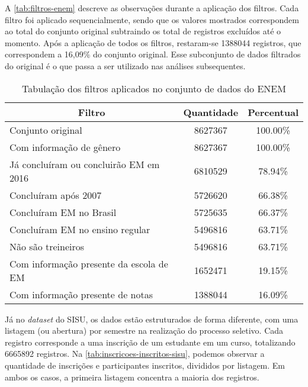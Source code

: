 A \autoref{tab:filtros-enem} descreve as observações durante a aplicação dos filtros. Cada filtro foi aplicado sequencialmente, sendo que os valores mostrados correspondem ao total do conjunto original subtraindo os total de registros excluídos até o momento. Após a aplicação de todos os filtros, restaram-se 1388044 registros, que correspondem a 16,09\% do conjunto original. Esse subconjunto de dados filtrados do original é o que passa a ser utilizado nas análises subsequentes.

\begin{table}[h]
  \begin{tabular}{lcc}
  \hline
  \multicolumn{1}{c}{\textbf{Filtro}}     & \textbf{Quantidade} & \textbf{Percentual} \\ \hline
  Conjunto original                       & 8627367             & 100.00\%            \\ \hline
  Com informação de gênero                & 8627367             & 100.00\%            \\ \hline
  Já concluíram ou concluirão EM em 2016  & 6810529             & 78.94\%             \\ \hline
  Concluíram após 2007                    & 5726620             & 66.38\%             \\ \hline
  Concluíram EM no Brasil                 & 5725635             & 66.37\%             \\ \hline
  Concluíram EM no ensino regular         & 5496816             & 63.71\%             \\ \hline
  Não são treineiros                      & 5496816             & 63.71\%             \\ \hline
  Com informação presente da escola de EM & 1652471             & 19.15\%             \\ \hline
  Com informação presente de notas        & 1388044             & 16.09\%             \\ \hline
  \end{tabular}
  \caption{Tabulação dos filtros aplicados no conjunto de dados do ENEM}
  \label{tab:filtros-enem}
  \end{table}

Já no \textit{dataset} do SISU, os dados estão estruturados de forma diferente, com uma listagem (ou abertura) por semestre na realização do processo seletivo. Cada registro corresponde a uma inscrição de um estudante em um curso, totalizando 6665892 registros. Na \autoref{tab:inscricoes-inscritos-sisu}, podemos observar a quantidade de inscrições e participantes inscritos, divididos por listagem. Em ambos os casos, a primeira listagem concentra a maioria dos registros.

